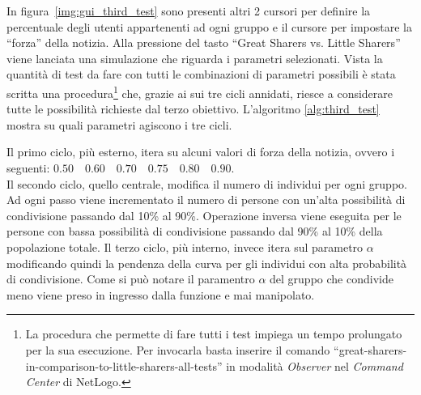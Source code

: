 In figura~\ref{img:gui_third_test} sono presenti altri 2 cursori per definire la percentuale degli utenti appartenenti ad ogni gruppo e 
il cursore per impostare la ``forza'' della notizia.
Alla pressione del tasto ``Great Sharers vs. Little Sharers'' viene lanciata una simulazione che riguarda i parametri selezionati.
Vista la quantità di test da fare con tutti le combinazioni di parametri possibili è stata scritta una procedura\footnote{\scriptsize 
La procedura che permette di fare tutti i test impiega un tempo prolungato per la sua esecuzione.
Per invocarla basta inserire il comando ``great-sharers-in-comparison-to-little-sharers-all-tests'' in modalità \emph{Observer} nel \emph{Command Center} di NetLogo.
} che, grazie ai sui tre cicli annidati, riesce a considerare tutte le possibilità richieste dal terzo obiettivo.
L'algoritmo \ref{alg:third_test} mostra su quali parametri agiscono i tre cicli.

Il primo ciclo, più esterno, itera su alcuni valori di forza della notizia, 
ovvero i seguenti: $0.50 \quad 0.60 \quad 0.70 \quad 0.75 \quad 0.80 \quad 0.90$.\\
Il secondo ciclo, quello centrale, modifica il numero di individui per ogni gruppo. 
Ad ogni passo viene incrementato il numero di persone con un'alta possibilità di condivisione 
passando dal 10\% al 90\%. Operazione inversa viene eseguita per le persone con bassa possibilità di 
condivisione passando dal 90\% al 10\% della popolazione totale.
Il terzo ciclo, più interno, invece itera sul parametro $\alpha$ modificando quindi la pendenza della 
curva per gli individui con alta probabilità di condivisione.
Come si può notare il paramentro $\alpha$ del gruppo che condivide meno viene preso in ingresso dalla funzione e
mai manipolato.

